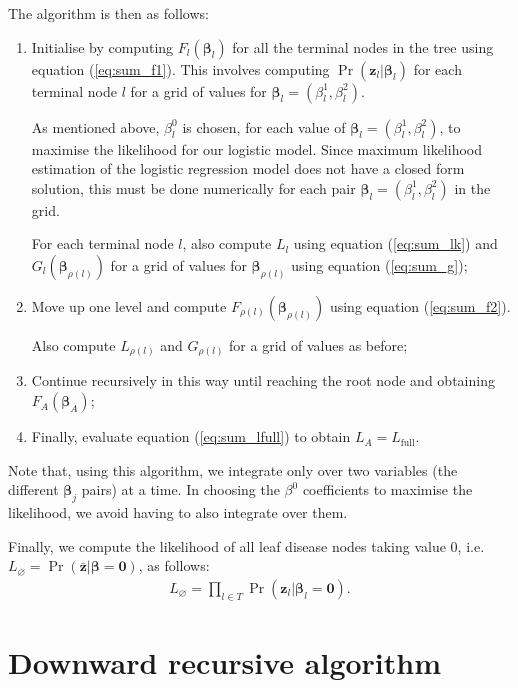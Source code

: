 \documentclass[10pt]{article}
\newcommand{\B}{\symbf{\beta}}
\newcommand{\bz}{\bar{\symbf{z}}}
\begin{document}
The algorithm is then as follows:
\begin{enumerate}
\item Initialise by computing $F_l(\B_l)$ for all the terminal nodes in the tree using equation (\ref{eq:sum_f1}). This involves computing $\Pr(\symbf{z}_l|\B_l)$ for each terminal node $l$ for a grid of values for $\B_l=(\beta_l^1,\beta_l^2)$.

  As mentioned above, $\beta_l^0$ is chosen, for each value of $\B_l=(\beta_l^1,\beta_l^2)$, to maximise the likelihood for our logistic model. Since maximum likelihood estimation of the logistic regression model does not have a closed form solution, this must be done numerically for each pair $\B_l=(\beta_l^1,\beta_l^2)$ in the grid.

 For each terminal node $l$, also compute $L_l$ using equation (\ref{eq:sum_lk}) and $G_l(\B_{\rho(l)})$ for a grid of values for $\B_{\rho(l)}$ using equation (\ref{eq:sum_g});
  
\item Move up one level and compute $F_{\rho(l)}(\B_{\rho(l)})$ using equation (\ref{eq:sum_f2}).

  Also compute $L_{\rho(l)}$ and $G_{\rho(l)}$ for a grid of values as before;
  
\item Continue recursively in this way until reaching the root node and obtaining $F_A(\B_A)$;
  
\item Finally, evaluate equation (\ref{eq:sum_lfull}) to obtain $L_A=L_\text{full}$.
\end{enumerate}
Note that, using this algorithm, we integrate only over two variables (the different $\B_j$ pairs) at a time. In choosing the $\beta^0$ coefficients to maximise the likelihood, we avoid having to also integrate over them.


Finally, we compute the likelihood of all leaf disease nodes taking value 0, i.e.\ $L_\varnothing = \Pr(\bz | \B = \symbf{0})$, as follows:
\begin{align*}
  L_\varnothing = \prod_{l\in T} \Pr(\symbf{z}_l|\B_l = \symbf{0}).
\end{align*}





\section{Downward recursive algorithm}\label{sec:downward}
\end{document}
